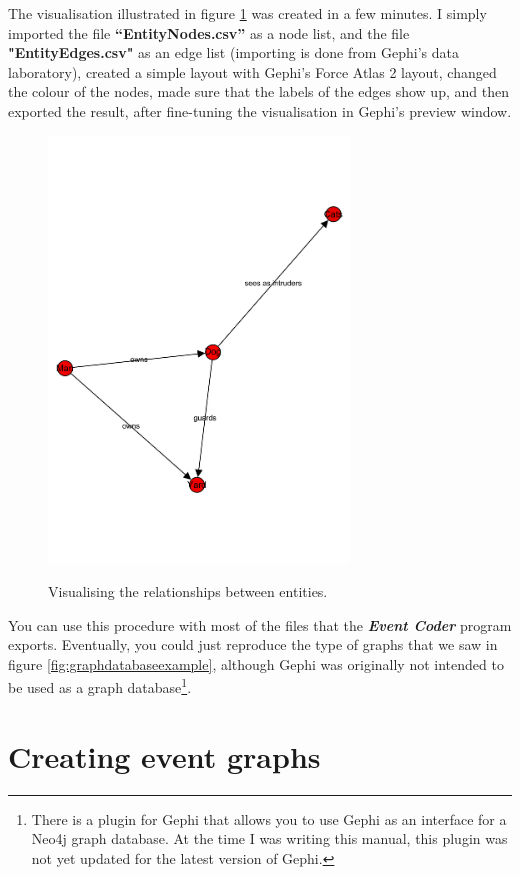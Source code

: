 \documentclass{memoir}
\begin{document}
The visualisation illustrated in figure \ref{fig:network} was created in a few minutes. I simply imported the file \textbf{``Entity\textunderscore Nodes.csv''} as a node list, and the file \textbf{"Entity\textunderscore Edges.csv"} as an edge list (importing is done from Gephi's data laboratory), created a simple layout with Gephi's Force Atlas 2 layout, changed the colour of the nodes, made sure that the labels of the edges show up, and then exported the result, after fine-tuning the visualisation in Gephi's preview window. 

\begin{figure}[h!]
  \centering
  \caption{Visualising the relationships between entities.}
  \includegraphics[width=80mm]{Diagram_5.pdf}
  \label{fig:network}
\end{figure}

You can use this procedure with most of the files that the \textbf{\emph{Event Coder}} program exports. Eventually, you could just reproduce the type of graphs that we saw in figure \ref{fig:graphdatabaseexample}, although Gephi was originally not intended to be used as a graph database\footnote{There is a plugin for Gephi that allows you to use Gephi as an interface for a Neo4j graph database. At the time I was writing this manual, this plugin was not yet updated for the latest version of Gephi.}.

\section{Creating event graphs}
\label{sec:creatingeventgraphs}
\end{document}
